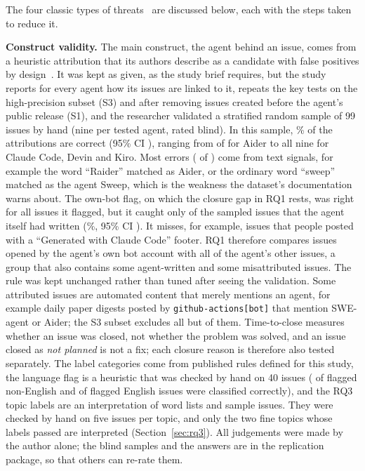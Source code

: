 The four classic types of threats~\cite{wohlin2012experimentation} are discussed below, each with the steps taken to reduce it.

\textbf{Construct validity.} The main construct, the agent behind an issue, comes from a heuristic attribution that its authors describe as a candidate with false positives by design~\cite{ghaleb2026codage}. It was kept as given, as the study brief requires, but the study reports for every agent how its issues are linked to it, repeats the key tests on the high-precision subset (S3) and after removing \NPreRelease{} issues created before the agent's public release (S1), and the researcher validated a stratified random sample of 99 issues by hand (nine per tested agent, rated blind). In this sample, \ValCorrectPct\% of the attributions are correct (95\% CI \ValCorrectCI), ranging from \ValCorrectAiderK{} of \ValCorrectAiderN{} for Aider to all nine for Claude Code, Devin and Kiro. Most errors (\ValWrongOtherK{} of \ValWrongOtherN) come from text signals, for example the word ``Raider'' matched as Aider, or the ordinary word ``sweep'' matched as the agent Sweep, which is the weakness the dataset's documentation warns about. The own-bot flag, on which the closure gap in RQ1 rests, was right for all \ValOwnBotPrecisionK{} issues it flagged, but it caught only \ValOwnBotRecallK{} of the \ValOwnBotRecallN{} sampled issues that the agent itself had written (\ValOwnBotRecallPct\%, 95\% CI \ValOwnBotRecallCI). It misses, for example, issues that people posted with a ``Generated with Claude Code'' footer. RQ1 therefore compares issues opened by the agent's own bot account with all of the agent's other issues, a group that also contains some agent-written and some misattributed issues. The rule was kept unchanged rather than tuned after seeing the validation. Some attributed issues are automated content that merely mentions an agent, for example \NDigest{} daily paper digests posted by \texttt{github-actions[bot]} that mention SWE-agent or Aider; the S3 subset excludes all but \NDigestInSThree{} of them. Time-to-close measures whether an issue was closed, not whether the problem was solved, and an issue closed as \emph{not planned} is not a fix; each closure reason is therefore also tested separately. The label categories come from published rules defined for this study, the language flag is a heuristic that was checked by hand on 40 issues (\ValNonEnK{} of \ValNonEnN{} flagged non-English and \ValEnK{} of \ValEnN{} flagged English issues were classified correctly), and the RQ3 topic labels are an interpretation of word lists and sample issues. They were checked by hand on five issues per topic, and only the two fine topics whose labels passed are interpreted (Section~\ref{sec:rq3}). All judgements were made by the author alone; the blind samples and the answers are in the replication package, so that others can re-rate them.


